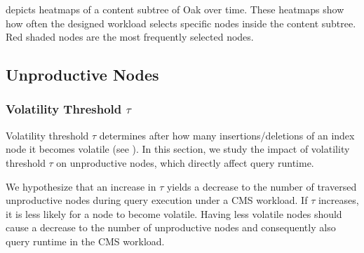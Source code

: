 \documentclass[abstracton,12pt]{scrartcl}
\theoremstyle{definition}
\begin{document}
 depicts heatmaps of a content subtree of Oak over time.
These heatmaps show how often the designed workload selects specific nodes
inside the content subtree. Red shaded nodes are the most frequently selected nodes.





\subsection{Unproductive Nodes}

\label{sec:unproductive-nodes-experiment}

\subsubsection{Volatility Threshold $\tau$}

\label{sec:threshold}

Volatility threshold $\tau$ determines after how many insertions/deletions of an index node
it becomes volatile (see ). In this section, we study the impact of
volatility threshold $\tau$ on unproductive nodes, which directly affect query runtime.

We hypothesize that an increase in $\tau$ yields a decrease to the number of
traversed unproductive nodes during query execution under a CMS workload. If
$\tau$ increases, it is
less likely for a node to become volatile. Having less volatile nodes should
cause a decrease to the number of unproductive nodes and consequently also query
runtime in the CMS workload.
\end{document}
